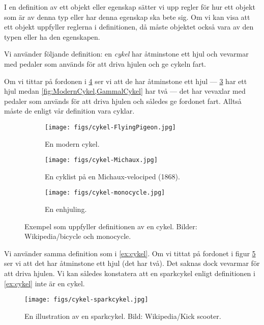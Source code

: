 I en definition av ett objekt eller egenskap sätter vi upp regler för hur ett 
objekt som är av denna typ eller har denna egenskap ska bete sig.
Om vi kan visa att ett objekt uppfyller reglerna i definitionen, då måste
objektet också vara av den typen eller ha den egenskapen.

\begin{example}\label{ex:cykel}
  Vi använder följande definition: en \emph{cykel} har åtminstone ett hjul och 
  vevarmar med pedaler som används för att driva hjulen och ge cykeln fart.

  Om vi tittar på fordonen i \cref{fig:cykel} ser vi att de har åtminstone ett 
  hjul --- \cref{fig:Enhjuling} har ett hjul medan  
  \cref{fig:ModernCykel,GammalCykel} har två --- det har vevaxlar med pedaler 
  som används för att driva hjulen och således ge fordonet fart.
  Alltså måste de enligt vår definition vara cyklar.
\end{example}
\begin{figure}
  \begin{subfigure}[t]{0.30\linewidth}
    \texttt{[image: figs/cykel-FlyingPigeon.jpg]}
    \caption{%
      En modern cykel.
    }\label{fig:ModernCykel}
  \end{subfigure}
  \hfill
  \begin{subfigure}[t]{0.30\linewidth}
    \texttt{[image: figs/cykel-Michaux.jpg]}
    \caption{%
      En cyklist på en Michaux-velociped (1868).
    }\label{fig:GammalCykel}
  \end{subfigure}
  \hfill
  \begin{subfigure}[t]{0.30\linewidth}
    \texttt{[image: figs/cykel-monocycle.jpg]}
    \caption{%
      En enhjuling.
    }\label{fig:Enhjuling}
  \end{subfigure}
  \caption{%
    Exempel som uppfyller definitionen av en cykel.
    Bilder: Wikipedia/bicycle och monocycle.
  }\label{fig:cykel}
\end{figure}

\begin{example}\label{ex:bil}
  Vi använder samma definition som i \cref{ex:cykel}.
  Om vi tittat på fordonet i figur \cref{fig:sparkcykel} ser vi att det har 
  åtminstone ett hjul (det har två).
  Det saknas dock vevarmar för att driva hjulen.
  Vi kan således konstatera att en sparkcykel enligt definitionen i 
  \cref{ex:cykel} inte är en cykel.
\end{example}
\begin{figure}
  \texttt{[image: figs/cykel-sparkcykel.jpg]}
  \caption{%
    En illustration av en sparkcykel.
    Bild: Wikipedia/Kick scooter.
  }\label{fig:sparkcykel}
\end{figure}

